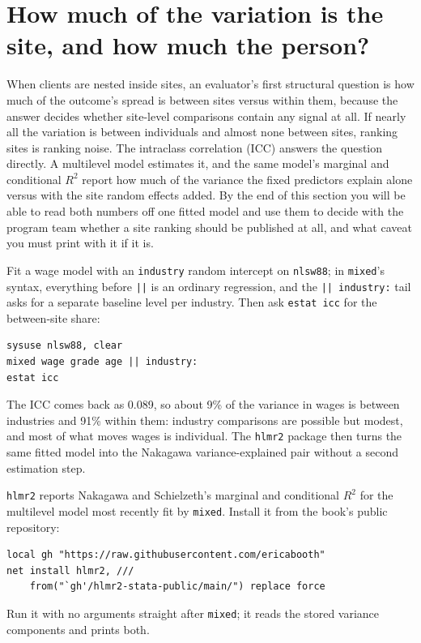 \documentclass[
    a4paper,
    fontsize=10pt,
    twoside=true,
    numbers=noenddot,
]{kaobook}
\begin{document}
\section{How much of the variation is the site, and how much the person?}\label{sec:icc}
When clients are nested inside sites, an evaluator's first structural question is how much of the outcome's spread is between sites versus within them, because the answer decides whether site-level comparisons contain any signal at all. If nearly all the variation is between individuals and almost none between sites, ranking sites is ranking noise. The intraclass correlation (ICC) answers the question directly. A multilevel model estimates it, and the same model's marginal and conditional $R^2$ \parencite{nakagawa2013general} report how much of the variance the fixed predictors explain alone versus with the site random effects added. By the end of this section you will be able to read both numbers off one fitted model and use them to decide with the program team whether a site ranking should be published at all, and what caveat you must print with it if it is.

Fit a wage model with an \texttt{industry} random intercept on \texttt{nlsw88}; in \texttt{mixed}'s syntax, everything before \texttt{||} is an ordinary regression, and the \texttt{|| industry:} tail asks for a separate baseline level per industry. Then ask \texttt{estat icc} for the between-site share:
\par
{\footnotesize
\begin{verbatim}
sysuse nlsw88, clear
mixed wage grade age || industry:
estat icc
\end{verbatim}
}
The ICC comes back as 0.089, so about 9\% of the variance in wages is between industries and 91\% within them: industry comparisons are possible but modest, and most of what moves wages is individual. The \texttt{hlmr2} package then turns the same fitted model into the Nakagawa variance-explained pair without a second estimation step.

\begin{kaobox}[frametitle=Package Integration: \texttt{hlmr2}]
\texttt{hlmr2} reports Nakagawa and Schielzeth's marginal and conditional $R^2$ for the multilevel model most recently fit by \texttt{mixed}. Install it from the book's public repository:
\par
{\footnotesize
\begin{verbatim}
local gh "https://raw.githubusercontent.com/ericabooth"
net install hlmr2, ///
    from("`gh'/hlmr2-stata-public/main/") replace force
\end{verbatim}
}
Run it with no arguments straight after \texttt{mixed}; it reads the stored variance components and prints both.
\end{kaobox}
\end{document}
